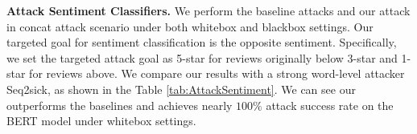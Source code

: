 



\textbf{Attack Sentiment Classifiers.} We perform the baseline attacks and our \advcodec attack in concat attack scenario  under both whitebox and blackbox settings. Our targeted goal for sentiment classification is the opposite sentiment. Specifically, we set the targeted attack goal as 5-star for reviews originally below 3-star and 1-star for reviews above.
We compare our results with a strong word-level attacker Seq2sick, as shown in the Table \ref{tab:AttackSentiment}. We can see our \advcodecword  outperforms the baselines and achieves nearly $100\%$ attack success rate on the BERT model under whitebox settings. 



